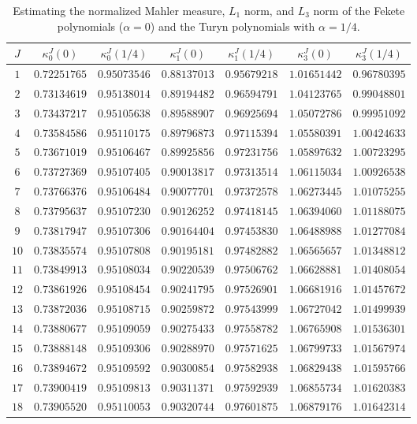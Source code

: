 \documentclass[reqno]{amsart}
\numberwithin{equation}{section}
\numberwithin{table}{section}
\numberwithin{figure}{section}
\newcommand\TS{\rule{0pt}{2.6ex}}
\newcommand\BS{\rule[-1.2ex]{0pt}{0pt}}
\begin{document}
\begin{table}[tbhp]\small
\caption{Estimating the normalized Mahler measure, $L_1$ norm, and $L_3$ norm of the Fekete polynomials  ($\alpha=0$) and the Turyn polynomials with $\alpha=1/4$.}\label{tableMeasLqData}
\begin{tabular}{|c|cc|cc|cc|}\hline
\TS\BS$J$ & $\kappa_0^J(0)$ & $\kappa_0^J(1/4)$ & $\kappa_1^J(0)$ & $\kappa_1^J(1/4)$ & $\kappa_3^J(0)$ & $\kappa_3^J(1/4)$\\\hline
$1$ & $0.72251765$ & $0.95073546$ & $0.88137013$ & $0.95679218$ & $1.01651442$ & $0.96780395$\\
$2$ & $0.73134619$ & $0.95138014$ & $0.89194482$ & $0.96594791$ & $1.04123765$ & $0.99048801$\\
$3$ & $0.73437217$ & $0.95105638$ & $0.89588907$ & $0.96925694$ & $1.05072786$ & $0.99951092$\\
$4$ & $0.73584586$ & $0.95110175$ & $0.89796873$ & $0.97115394$ & $1.05580391$ & $1.00424633$\\
$5$ & $0.73671019$ & $0.95106467$ & $0.89925856$ & $0.97231756$ & $1.05897632$ & $1.00723295$\\
$6$ & $0.73727369$ & $0.95107405$ & $0.90013817$ & $0.97313514$ & $1.06115034$ & $1.00926538$\\
$7$ & $0.73766376$ & $0.95106484$ & $0.90077701$ & $0.97372578$ & $1.06273445$ & $1.01075255$\\
$8$ & $0.73795637$ & $0.95107230$ & $0.90126252$ & $0.97418145$ & $1.06394060$ & $1.01188075$\\
$9$ & $0.73817947$ & $0.95107306$ & $0.90164404$ & $0.97453830$ & $1.06488988$ & $1.01277084$\\
$10$ & $0.73835574$ & $0.95107808$ & $0.90195181$ & $0.97482882$ & $1.06565657$ & $1.01348812$\\
$11$ & $0.73849913$ & $0.95108034$ & $0.90220539$ & $0.97506762$ & $1.06628881$ & $1.01408054$\\
$12$ & $0.73861926$ & $0.95108454$ & $0.90241795$ & $0.97526901$ & $1.06681916$ & $1.01457672$\\
$13$ & $0.73872036$ & $0.95108715$ & $0.90259872$ & $0.97543999$ & $1.06727042$ & $1.01499939$\\
$14$ & $0.73880677$ & $0.95109059$ & $0.90275433$ & $0.97558782$ & $1.06765908$ & $1.01536301$\\
$15$ & $0.73888148$ & $0.95109306$ & $0.90288970$ & $0.97571625$ & $1.06799733$ & $1.01567974$\\
$16$ & $0.73894672$ & $0.95109592$ & $0.90300854$ & $0.97582938$ & $1.06829438$ & $1.01595766$\\
$17$ & $0.73900419$ & $0.95109813$ & $0.90311371$ & $0.97592939$ & $1.06855734$ & $1.01620383$\\
$18$ & $0.73905520$ & $0.95110053$ & $0.90320744$ & $0.97601875$ & $1.06879176$ & $1.01642314$\\\hline
\end{tabular}
\end{table}
\end{document}
